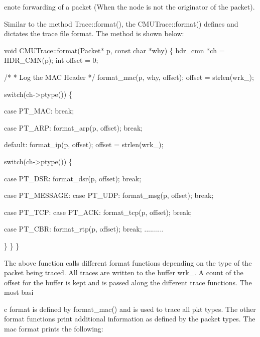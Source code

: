 enote forwarding of a packet (When the node is not the originator of the packet).

Similar to the method Trace::format(), the CMUTrace::format() defines and dictates the trace file format. The method is shown below:

\begin{program}
void CMUTrace::format(Packet* p, const char *why)
\{
	hdr_cmn *ch = HDR_CMN(p);
	int offset = 0;

	/*
	 * Log the MAC Header
	 */
	format_mac(p, why, offset);
	offset = strlen(wrk_);

	switch(ch->ptype()) \{

	case PT_MAC:
		break;

	case PT_ARP:
		format_arp(p, offset);
		break;

	default:
		format_ip(p, offset);
		offset = strlen(wrk_);

		switch(ch->ptype()) \{

		case PT_DSR:
			format_dsr(p, offset);
			break;

		case PT_MESSAGE:
		case PT_UDP:
			format_msg(p, offset);
			break;
			
		case PT_TCP:
		case PT_ACK:
			format_tcp(p, offset);
			break;
			
		case PT_CBR:
			format_rtp(p, offset);
			break;
		..........

		\}
	\}
\}
\end{program}
The above function calls different format functions depending on the type of the packet being traced. All traces are written to the buffer wrk\_. A count of the offset for the buffer is kept and is passed along the different trace functions. The most basi











c format is defined by format\_mac() and is used to trace all pkt types. The other format functions print additional information as defined by the packet types. The mac format prints the following:

